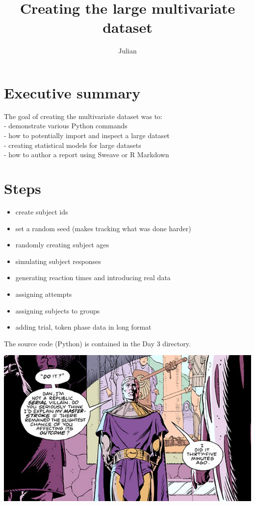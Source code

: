 \documentclass[]{article}
\title{Creating the large multivariate dataset}
\author{Julian}
\date{}
\begin{document}
\maketitle


{
\hypersetup{linkcolor=black}
\setcounter{tocdepth}{2}
\tableofcontents
}
\section{Executive summary}\label{executive-summary}

The goal of creating the multivariate dataset was to:\\- demonstrate
various Python commands\\- how to potentially import and inspect a large
dataset\\- creating statistical models for large datasets\\- how to
author a report using Sweave or R Markdown

\section{Steps}\label{steps}

\begin{itemize}
\itemsep1pt\parskip0pt
\item
  create subject ids\\
\item
  set a random seed (makes tracking what was done harder)\\
\item
  randomly creating subject ages\\
\item
  simulating subject responses\\
\item
  generating reaction times and introducing real data\\
\item
  assigning attempts\\
\item
  assigning subjects to groups\\
\item
  adding trial, token phase data in long format
\end{itemize}

The source code (Python) is contained in the Day 3 directory.

\includegraphics{ozymandias-by-gibbons.jpg}
\end{document}

